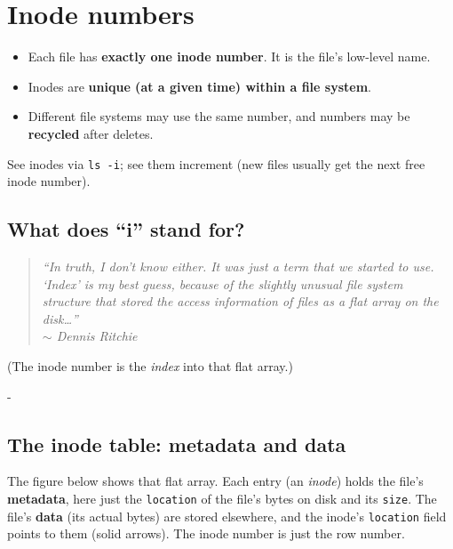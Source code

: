 \documentclass[11pt,a4paper]{article}
\makeatletter
\newcommand{\keepspace}[1]{\par\penalty-100\begingroup
  \setlength{\dimen@}{#1}\dimen@ii\pagegoal\advance\dimen@ii-\pagetotal
  \ifdim\dimen@>\dimen@ii\ifdim\dimen@ii>\z@\vfil\fi\break\fi\endgroup}
\makeatother
\begin{document}
\section{Inode numbers}\label{sec:inode}

\begin{defbox}
\begin{itemize}
  \item Each file has \textbf{exactly one inode number}. It is the file's
        low-level name.
  \item Inodes are \textbf{unique (at a given time) within a file system}.
  \item Different file systems may use the same number, and numbers may be
        \textbf{recycled} after deletes.
\end{itemize}
\end{defbox}

See inodes via \texttt{ls -i}; see them increment (new files usually get
the next free inode number).

\subsection{What does ``i'' stand for?}

\begin{quote}
\itshape ``In truth, I don't know either. It was just a term that we started
to use. `Index' is my best guess, because of the slightly unusual file system
structure that stored the access information of files as a flat array on the
disk\ldots'' \\
\upshape\hfill ${\sim}$ Dennis Ritchie
\end{quote}

\noindent (The inode number is the \emph{index} into that flat array.)

\keepspace{7\baselineskip}
\subsection{The inode table: metadata and data}

The figure below shows that flat array. Each entry (an \emph{inode}) holds the
file's \textbf{metadata}, here just the \texttt{location} of the file's bytes
on disk and its \texttt{size}. The file's \textbf{data} (its actual bytes) are
stored elsewhere, and the inode's \texttt{location} field points to them
(solid arrows). The inode number is just the row number.
\end{document}
